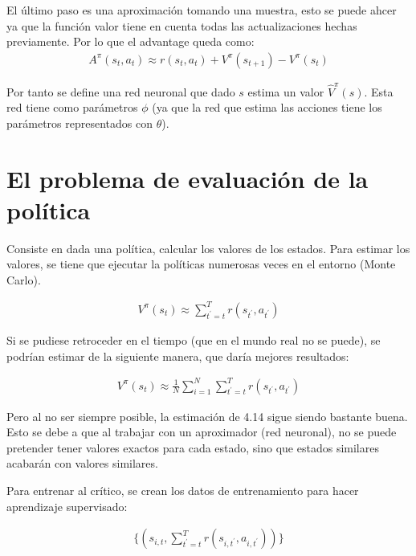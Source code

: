 El último paso es una aproximación tomando una muestra, esto se puede ahcer ya que la función
valor tiene en cuenta todas las actualizaciones hechas previamente. Por lo que el advantage
queda como:
\begin{align}
A ^ { \pi } ( s _ { t } , a _ { t } ) \approx r ( s _ { t } , a _ { t } ) + V ^ { \pi } ( s _ { t + 1 } ) - V ^ { \pi } ( s _ { t } )
\end{align}

Por tanto se define una red neuronal que dado $s$ estima un valor $\hat{V}^\pi(s)$.
Esta red tiene como parámetros $\phi$ (ya que la red que estima las acciones tiene los parámetros
representados con $\theta$).

\section{El problema de evaluación de la política}%
\label{sec:el_problema_de_evaluación_de_la_política}

Consiste en dada una política, calcular los valores de los estados. Para estimar los valores,
se tiene que ejecutar la políticas numerosas veces en el entorno (Monte Carlo).

\begin{align}
V ^ { \pi } ( s _ { t } ) \approx \sum _ { t ^ { \prime } = t } ^ { T } r ( s _ { t ^ { \prime } } , a _ { t ^ { \prime } } )
\end{align}

Si se pudiese retroceder en el tiempo (que en el mundo real no se puede), se podrían estimar de
la siguiente manera, que daría mejores resultados:

\begin{align}
V ^ { \pi } ( s _ { t } ) \approx \frac { 1 } { N } \sum _ { i = 1 } ^ { N } \sum _ { t ^ { \prime } = t } ^ { T } r ( s _ { t ^ { \prime } } , a _ { t ^ { \prime } } )
\end{align}

Pero al no ser siempre posible, la estimación de 4.14 sigue siendo bastante buena. Esto se debe
a que al trabajar con un aproximador (red neuronal), no se puede pretender tener valores
exactos para cada estado, sino que estados similares acabarán con valores similares.

Para entrenar al crítico, se crean los datos de entrenamiento para hacer aprendizaje
supervisado:

\begin{align}
\{ ( s _ { i , t } , \sum _ { t ^ { \prime } = t } ^ { T } r ( s _ { i , t ^ { \prime } } , a _ { i , t ^ { \prime } } ) ) \}
\end{align}

